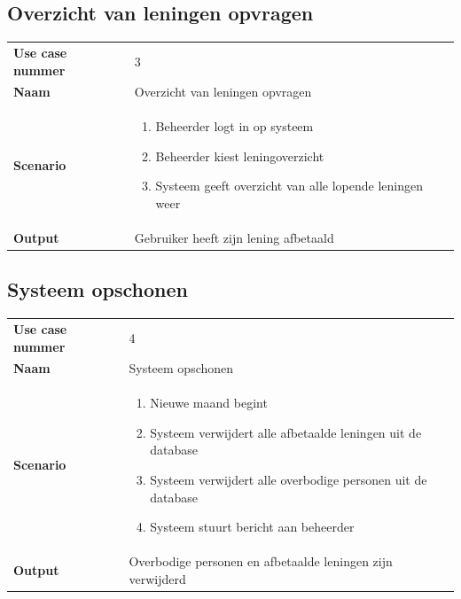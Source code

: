 \documentclass[11pt,english]{article}
\begin{document}
	\newpage
	\subsection{Overzicht van leningen opvragen}
	\begin{tabularx}{\textwidth}{ l | X }
		\textbf{Use case nummer} & 3 \\
		\textbf{Naam} & Overzicht van leningen opvragen \\
		\textbf{Scenario} &
		\begin{enumerate}
			\item Beheerder logt in op systeem
			\item Beheerder kiest leningoverzicht
			\item Systeem geeft overzicht van alle lopende leningen weer
		\end{enumerate} \\
		\textbf{Output} & Gebruiker heeft zijn lening afbetaald
	\end{tabularx}

	\newpage
	\subsection{Systeem opschonen}
	\begin{tabularx}{\textwidth}{ l | X }
		\textbf{Use case nummer} & 4 \\
		\textbf{Naam} & Systeem opschonen \\
		\textbf{Scenario} &
		\begin{enumerate}
			\item Nieuwe maand begint
			\item Systeem verwijdert alle afbetaalde leningen uit de database
			\item Systeem verwijdert alle overbodige personen uit de database
			\item Systeem stuurt bericht aan beheerder
		\end{enumerate} \\
		\textbf{Output} & Overbodige personen en afbetaalde leningen zijn verwijderd
	\end{tabularx}

	\newpage
\end{document}
